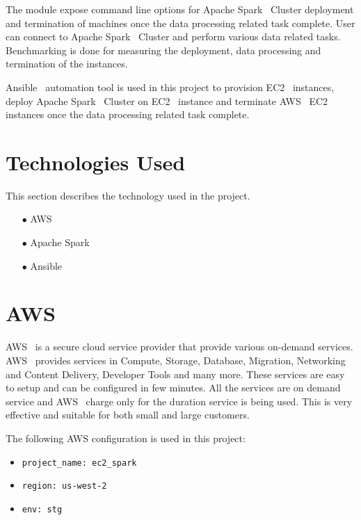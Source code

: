 The module expose command line options for Apache
Spark~\cite{hid-sp18-511-www-spark} Cluster deployment and termination
of machines once the data processing related task complete. User can
connect to Apache Spark~\cite{hid-sp18-511-www-spark} Cluster and
perform various data related tasks. Benchmarking is done for measuring
the deployment, data processing and termination of the instances.

Ansible~\cite{hid-sp18-511-www-ansible} automation tool is used in
this project to provision EC2~\cite{hid-sp18-511-www-ec2} instances,
deploy Apache Spark~\cite{hid-sp18-511-www-spark} Cluster on
EC2~\cite{hid-sp18-511-www-ec2} instance and terminate
AWS~\cite{hid-sp18-511-www-aws} EC2~\cite{hid-sp18-511-www-ec2}
instances once the data processing related task complete.

\section{Technologies Used}
This section describes the technology used in the project.

\begin{itemize}
	\item[$\bullet$] AWS 
	\item[$\bullet$] Apache Spark 
	\item[$\bullet$] Ansible
\end{itemize}

\section{AWS}

AWS~\cite{hid-sp18-511-www-aws} is a secure cloud service provider
that provide various on-demand services.
AWS~\cite{hid-sp18-511-www-aws} provides services in Compute, Storage,
Database, Migration, Networking and Content Delivery, Developer Tools
and many more. These services are easy to setup and can be configured
in few minutes. All the services are on demand service and
AWS~\cite{hid-sp18-511-www-aws} charge only for the duration service
is being used. This is very effective and suitable for both small and
large customers.

The following AWS configuration is used in this project:

\begin{itemize}
	\item \verb|project_name: ec2_spark|
	\item \verb|region: us-west-2|
	\item \verb|env: stg|
\end{itemize}


